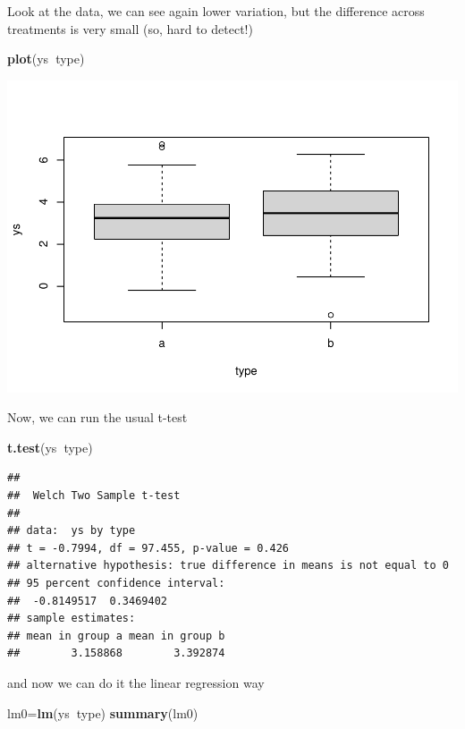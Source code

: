\documentclass[
]{book}
\newenvironment{Shaded}{\begin{snugshade}}{\end{snugshade}}
\newcommand{\KeywordTok}[1]{\textcolor[rgb]{0.13,0.29,0.53}{\textbf{#1}}}
\newcommand{\NormalTok}[1]{#1}
\newcommand{\OperatorTok}[1]{\textcolor[rgb]{0.81,0.36,0.00}{\textbf{#1}}}
\begin{document}
Look at the data, we can see again lower variation, but the difference across treatments is very small (so, hard to detect!)

\begin{Shaded}
\begin{Highlighting}[]
\KeywordTok{plot}\NormalTok{(ys}\OperatorTok{~}\NormalTok{type)}
\end{Highlighting}
\end{Shaded}

\includegraphics{ECOMODbook_files/figure-latex/a8.16-1.pdf}

Now, we can run the usual t-test

\begin{Shaded}
\begin{Highlighting}[]
\KeywordTok{t.test}\NormalTok{(ys}\OperatorTok{~}\NormalTok{type)}
\end{Highlighting}
\end{Shaded}

\begin{verbatim}
## 
## 	Welch Two Sample t-test
## 
## data:  ys by type
## t = -0.7994, df = 97.455, p-value = 0.426
## alternative hypothesis: true difference in means is not equal to 0
## 95 percent confidence interval:
##  -0.8149517  0.3469402
## sample estimates:
## mean in group a mean in group b 
##        3.158868        3.392874
\end{verbatim}

and now we can do it the linear regression way

\begin{Shaded}
\begin{Highlighting}[]
\NormalTok{lm0=}\KeywordTok{lm}\NormalTok{(ys}\OperatorTok{~}\NormalTok{type)}
\KeywordTok{summary}\NormalTok{(lm0)}
\end{Highlighting}
\end{Shaded}
\end{document}
